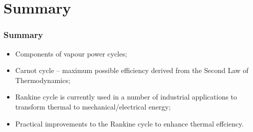 \documentclass[10pt,compress,handout,ignorenonframetext]{beamer}
\begin{document}
\section{Summary}
\begin{frame}
 \frametitle{Summary}
  \begin{itemize}
   \item <1-> Components of vapour power cycles;
   \item <2-> Carnot cycle -- maximum possible efficiency derived from the Second Law of Thermodynamics;
   \item <3-> Rankine cycle is currently used in a number of industrial applications to transform thermal to mechanical/electrical energy;
   \item <4-> Practical improvements to the Rankine cycle to enhance thermal effciency.
  \end{itemize}
\end{frame}
\end{document}

